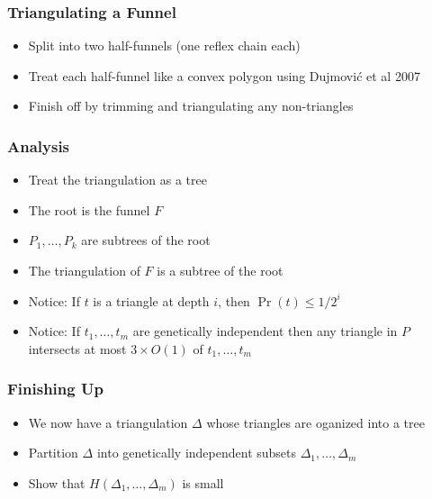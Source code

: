 \documentclass{beamer}
\begin{document}
\frame
{
   \frametitle{Triangulating a Funnel}
   \begin{center} 
   \end{center}
   \begin{itemize}
     \item<2->Split into two half-funnels (one reflex chain each)
     \item<3->Treat each half-funnel like a convex polygon using Dujmovi\'c et al 2007
     \item<4->Finish off by trimming and triangulating any non-triangles
   \end{itemize}
}

\frame
{
  \frametitle{Analysis}
  \begin{itemize}
    \item<1-> Treat the triangulation as a tree
      \item<2-> The root is the funnel $F$
      \item<3-> $P_1,\ldots,P_k$ are subtrees of the root
      \item<4-> The triangulation of $F$ is a subtree of the root
      \item<5-> Notice: If $t$ is a triangle at depth $i$, then $\Pr(t)\le
1/2^i$
      \item<5-> Notice: If $t_1,\ldots,t_m$ are genetically
independent then any triangle in $P$ intersects at most $3\times O(1)$ of
$t_1,\ldots,t_m$ 
  \end{itemize}
}

\frame
{
  \frametitle{Finishing Up}
  \begin{itemize}
    \item<1-> We now have a triangulation $\Delta$ whose triangles are
oganized into a tree
    \item<2-> Partition $\Delta$ into genetically independent subsets
$\Delta_1,\ldots,\Delta_m$ 
    \item<3-> Show that $H(\Delta_1,\ldots,\Delta_m)$ is small
  \end{itemize}
}
\end{document}
